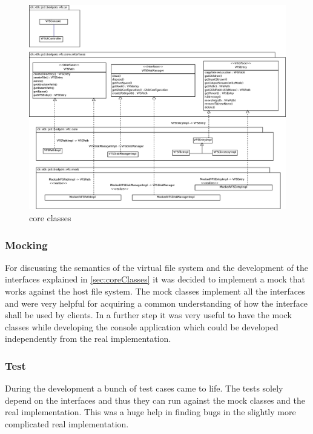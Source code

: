 \begin{figure}[h!]
\centering
\includegraphics[width=1\textwidth]{figures/core_classes.eps}
\caption{core classes}
\label{fig:core_classes}
\end{figure}

\subsubsection{Mocking}
For discussing the semantics of the virtual file system and the development of 
the interfaces explained in \ref{sec:coreClasses} it was decided to implement a mock
that works against the host file system. The mock classes implement all
the interfaces and were very helpful for acquiring a common understanding of how
the interface shall be used by clients. In a further step it was very useful to have
the mock classes while developing the console application which could be
developed independently from the real implementation.
\subsubsection{Test}
During the development a bunch of test cases came to life. The tests solely
depend on the interfaces and thus they can run against the mock classes and the
real implementation. This was a huge help in finding bugs in the slightly more
complicated real implementation.